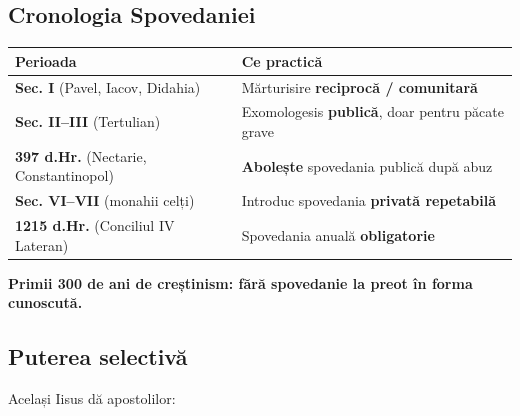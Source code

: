 \documentclass[12pt,a4paper,twoside,openany]{book}
\begin{document}
\subsection{Cronologia Spovedaniei}
\begin{center}
\small
\begin{tabular}{L{6.6cm}L{8.5cm}}
\toprule
{}
\textbf{Perioada} & \textbf{Ce practică} \\
\midrule
\textbf{Sec. I} (Pavel, Iacov, Didahia) & Mărturisire \textbf{reciprocă / comunitară} \\
\textbf{Sec. II–III} (Tertulian) & Exomologesis \textbf{publică}, doar pentru păcate grave \\
\textbf{397 d.Hr.} (Nectarie, Constantinopol) & \textbf{Abolește} spovedania publică după abuz \\
\textbf{Sec. VI–VII} (monahii celți) & Introduc spovedania \textbf{privată repetabilă} \\
\textbf{1215 d.Hr.} (Conciliul IV Lateran) & Spovedania anuală \textbf{obligatorie} \\
\bottomrule
\end{tabular}
\end{center}
\normalsize
\textbf{Primii 300 de ani de creștinism: fără spovedanie la preot în forma cunoscută.}


\subsection{Puterea selectivă}
Același Iisus dă apostolilor:
\end{document}
